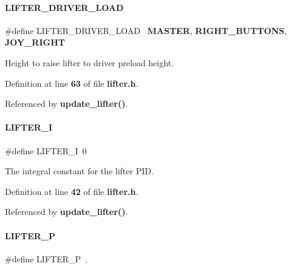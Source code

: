 \mbox{\label{lifter_8h_ad4a88f04887d4f1f4e5fa057b29f68e9}} 
\paragraph{L\+I\+F\+T\+E\+R\+\_\+\+D\+R\+I\+V\+E\+R\+\_\+\+L\+O\+AD}
{\footnotesize\ttfamily \#define L\+I\+F\+T\+E\+R\+\_\+\+D\+R\+I\+V\+E\+R\+\_\+\+L\+O\+AD~\textbf{ M\+A\+S\+T\+ER}, \textbf{ R\+I\+G\+H\+T\+\_\+\+B\+U\+T\+T\+O\+NS}, \textbf{ J\+O\+Y\+\_\+\+R\+I\+G\+HT}}



Height to raise lifter to driver preload height. 



Definition at line \textbf{ 63} of file \textbf{ lifter.\+h}.



Referenced by \textbf{ update\+\_\+lifter()}.

\mbox{\label{lifter_8h_a4950feabec4e85bf27c1f2e4ec98755a}} 
\paragraph{L\+I\+F\+T\+E\+R\+\_\+I}
{\footnotesize\ttfamily \#define L\+I\+F\+T\+E\+R\+\_\+I~0}



The integral constant for the lifter P\+ID. 



Definition at line \textbf{ 42} of file \textbf{ lifter.\+h}.



Referenced by \textbf{ update\+\_\+lifter()}.

\mbox{\label{lifter_8h_ae5623433650815b810d784e0da176e3c}} 
\paragraph{L\+I\+F\+T\+E\+R\+\_\+P}
{\footnotesize\ttfamily \#define L\+I\+F\+T\+E\+R\+\_\+P~.}



